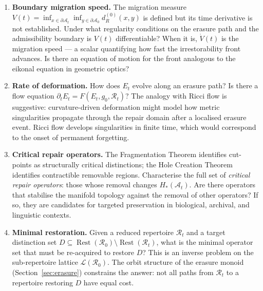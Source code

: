 \documentclass[12pt, oneside]{article}
\theoremstyle{plain}
\theoremstyle{definition}
\theoremstyle{remark}
\DeclareMathOperator{\Rest}{Rest}
\newcommand{\At}{\mathcal{A}_t}
\newcommand{\Azero}{\mathcal{A}_0}
\newcommand{\Rt}{\mathcal{R}_t}
\newcommand{\Rzero}{\mathcal{R}_0}
\newcommand{\Restzt}{\Rest(\Rt)}
\newcommand{\Restzero}{\Rest(\Rzero)}
\newcommand{\Et}{E_t}
\begin{document}
\begin{enumerate}

  \item \textbf{Boundary migration speed.}\;
    The migration measure $V(t) = \inf_{x \in \partial\At}
    \inf_{y \in \partial\Azero} d_R^{(0)}(x, y)$
    is defined but its time
    derivative is not established.
    Under what regularity conditions on the erasure path and the
    admissibility boundary is $V(t)$ differentiable?
    When it is, $\dot{V}(t)$ is the migration speed --- a scalar
    quantifying how fast the irrestorability front advances.
    Is there an equation of motion for the front analogous to the
    eikonal equation in geometric optics?

  \item \textbf{Rate of deformation.}\;
    How does $\Et$ evolve along an erasure path?
    Is there a flow equation $\partial_t \Et = F(\Et, g_0, \Rt)$?
    The analogy with Ricci flow is suggestive: curvature-driven
    deformation might model how metric singularities propagate
    through the repair domain after a localised erasure event.
    Ricci flow develops singularities in finite time, which would
    correspond to the onset of permanent forgetting.

  \item \textbf{Critical repair operators.}\;
    The Fragmentation Theorem identifies cut-points as structurally
    critical distinctions; the Hole Creation Theorem identifies
    contractible removable regions.
    Characterise the full set of \emph{critical repair operators}:
    those whose removal changes $H_*(\At)$.
    Are there operators that stabilise the manifold topology
    against the removal of other operators?
    If so, they are candidates for targeted preservation in
    biological, archival, and linguistic contexts.

  \item \textbf{Minimal restoration.}\;
    Given a reduced repertoire $\Rt$ and a target distinction set
    $D \subseteq \Restzero \setminus \Restzt$, what is the minimal
    operator set that must be re-acquired to restore $D$?
    This is an inverse problem on the sub-repertoire lattice
    $\mathcal{L}(\Rzero)$.
    The orbit structure of the erasure monoid
    (Section~\ref{sec:erasure}) constrains the answer: not all
    paths from $\Rt$ to a repertoire restoring $D$ have equal cost.


\end{enumerate}
\end{document}
